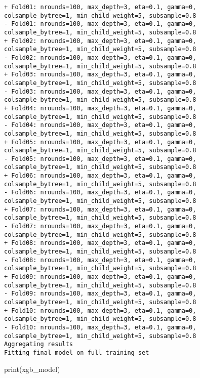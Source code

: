 \documentclass[
  letterpaper,
  DIV=11,
  numbers=noendperiod]{scrartcl}
\newenvironment{Shaded}{\begin{snugshade}}{\end{snugshade}}
\newcommand{\FunctionTok}[1]{\textcolor[rgb]{0.28,0.35,0.67}{#1}}
\newcommand{\NormalTok}[1]{\textcolor[rgb]{0.00,0.23,0.31}{#1}}
\begin{document}
\begin{verbatim}
+ Fold01: nrounds=100, max_depth=3, eta=0.1, gamma=0, colsample_bytree=1, min_child_weight=5, subsample=0.8 
- Fold01: nrounds=100, max_depth=3, eta=0.1, gamma=0, colsample_bytree=1, min_child_weight=5, subsample=0.8 
+ Fold02: nrounds=100, max_depth=3, eta=0.1, gamma=0, colsample_bytree=1, min_child_weight=5, subsample=0.8 
- Fold02: nrounds=100, max_depth=3, eta=0.1, gamma=0, colsample_bytree=1, min_child_weight=5, subsample=0.8 
+ Fold03: nrounds=100, max_depth=3, eta=0.1, gamma=0, colsample_bytree=1, min_child_weight=5, subsample=0.8 
- Fold03: nrounds=100, max_depth=3, eta=0.1, gamma=0, colsample_bytree=1, min_child_weight=5, subsample=0.8 
+ Fold04: nrounds=100, max_depth=3, eta=0.1, gamma=0, colsample_bytree=1, min_child_weight=5, subsample=0.8 
- Fold04: nrounds=100, max_depth=3, eta=0.1, gamma=0, colsample_bytree=1, min_child_weight=5, subsample=0.8 
+ Fold05: nrounds=100, max_depth=3, eta=0.1, gamma=0, colsample_bytree=1, min_child_weight=5, subsample=0.8 
- Fold05: nrounds=100, max_depth=3, eta=0.1, gamma=0, colsample_bytree=1, min_child_weight=5, subsample=0.8 
+ Fold06: nrounds=100, max_depth=3, eta=0.1, gamma=0, colsample_bytree=1, min_child_weight=5, subsample=0.8 
- Fold06: nrounds=100, max_depth=3, eta=0.1, gamma=0, colsample_bytree=1, min_child_weight=5, subsample=0.8 
+ Fold07: nrounds=100, max_depth=3, eta=0.1, gamma=0, colsample_bytree=1, min_child_weight=5, subsample=0.8 
- Fold07: nrounds=100, max_depth=3, eta=0.1, gamma=0, colsample_bytree=1, min_child_weight=5, subsample=0.8 
+ Fold08: nrounds=100, max_depth=3, eta=0.1, gamma=0, colsample_bytree=1, min_child_weight=5, subsample=0.8 
- Fold08: nrounds=100, max_depth=3, eta=0.1, gamma=0, colsample_bytree=1, min_child_weight=5, subsample=0.8 
+ Fold09: nrounds=100, max_depth=3, eta=0.1, gamma=0, colsample_bytree=1, min_child_weight=5, subsample=0.8 
- Fold09: nrounds=100, max_depth=3, eta=0.1, gamma=0, colsample_bytree=1, min_child_weight=5, subsample=0.8 
+ Fold10: nrounds=100, max_depth=3, eta=0.1, gamma=0, colsample_bytree=1, min_child_weight=5, subsample=0.8 
- Fold10: nrounds=100, max_depth=3, eta=0.1, gamma=0, colsample_bytree=1, min_child_weight=5, subsample=0.8 
Aggregating results
Fitting final model on full training set
\end{verbatim}

\begin{Shaded}
\begin{Highlighting}[]
\FunctionTok{print}\NormalTok{(xgb\_model)}
\end{Highlighting}
\end{Shaded}
\end{document}
